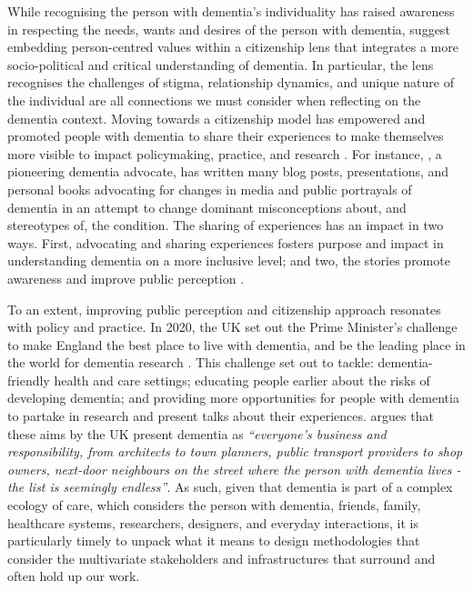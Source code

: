 While recognising the person with dementia's individuality has raised awareness in respecting the needs, wants and desires of the person with dementia, \cite{bartlett_personhood_2007} suggest embedding person-centred values within a citizenship lens that integrates a more socio-political and critical understanding of dementia. In particular, the lens recognises the challenges of stigma, relationship dynamics, and unique nature of the individual are all connections we must consider when reflecting on the dementia context. Moving towards a citizenship model has empowered and promoted people with dementia to share their experiences to make themselves more visible to impact policymaking, practice, and research \citep{weetch_involvement_2020}. For instance, \cite{bryden_challenging_2020}, a pioneering dementia advocate, has written many blog posts, presentations, and personal books advocating for changes in media and public portrayals of dementia in an attempt to change dominant misconceptions about, and stereotypes of, the condition. The sharing of experiences has an impact in two ways. First, advocating and sharing experiences fosters purpose and impact in understanding dementia on a more inclusive level; and two, the stories promote awareness and improve public perception \citep{reynolds2017stigma}.

To an extent, improving public perception and citizenship approach resonates with policy and practice. In 2020, the UK set out the Prime Minister’s challenge to make England the best place to live with dementia, and be the leading place in the world for dementia research \citep{budgett2021designing}. This challenge set out to tackle: dementia-friendly health and care settings; educating people earlier about the risks of developing dementia; and  providing more opportunities for people with dementia to partake in research and present talks about their experiences. \cite{keady2017social} argues that these aims by the UK present dementia as \textit{``everyone’s business and responsibility, from architects to town planners, public transport providers to shop owners, next-door neighbours on the street where the person with dementia lives - the list is seemingly endless''}. As such, given that dementia is part of a complex ecology of care, which considers the person with dementia, friends, family, healthcare systems, researchers, designers, and everyday interactions, it is particularly timely to unpack what it means to design methodologies that consider the multivariate stakeholders and infrastructures that surround and often hold up our work. 

